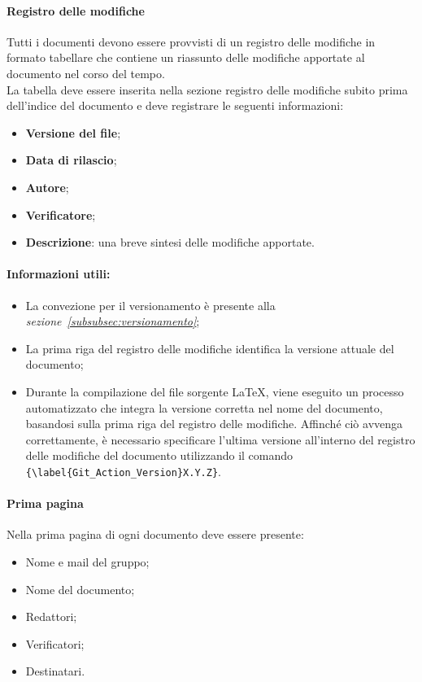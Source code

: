 \paragraph{Registro delle modifiche}
\label{sec:RegistroModifiche}
Tutti i documenti devono essere provvisti di un registro delle modifiche in formato tabellare che contiene un riassunto
delle modifiche apportate al documento nel corso del tempo. \\
La tabella deve essere inserita nella sezione registro delle modifiche subito prima dell’indice del documento e deve registrare le seguenti informazioni:
\begin{itemize}
    \item \textbf{Versione del file};
    \item \textbf{Data di rilascio};
    \item \textbf{Autore};
    \item \textbf{Verificatore};
    \item \textbf{Descrizione}: una breve sintesi delle modifiche apportate.
\end{itemize}

\hypertarget{par:infoUtiliRegistroMod}{\paragraph*{Informazioni utili:}}
\begin{itemize}
    \item La convezione per il versionamento è presente alla \textit{sezione~\ref{subsubsec:versionamento}};
    \item La prima riga del registro delle modifiche identifica la versione attuale del documento;
    \item Durante la compilazione del file sorgente \LaTeX, viene eseguito un processo automatizzato che integra la versione corretta nel nome del documento, basandosi sulla prima riga del registro delle modifiche. Affinché ciò avvenga correttamente, è necessario specificare l'ultima versione all'interno del registro delle modifiche del documento utilizzando il comando \verb|{\label{Git_Action_Version}X.Y.Z}|.
\end{itemize}

\paragraph{Prima pagina}
Nella prima pagina di ogni documento deve essere presente:
\begin{itemize}
    \item Nome e mail del gruppo;
    \item Nome del documento;
    \item Redattori;
    \item Verificatori;
    \item Destinatari.
\end{itemize}

